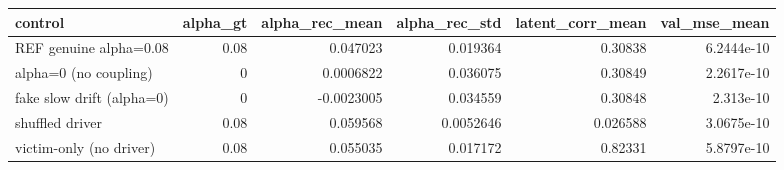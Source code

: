 \begin{tabular}{lrrrrr}
\toprule
control & alpha_gt & alpha_rec_mean & alpha_rec_std & latent_corr_mean & val_mse_mean \\
\midrule
REF genuine alpha=0.08 & 0.08 & 0.047023 & 0.019364 & 0.30838 & 6.2444e-10 \\
alpha=0 (no coupling) & 0 & 0.0006822 & 0.036075 & 0.30849 & 2.2617e-10 \\
fake slow drift (alpha=0) & 0 & -0.0023005 & 0.034559 & 0.30848 & 2.313e-10 \\
shuffled driver & 0.08 & 0.059568 & 0.0052646 & 0.026588 & 3.0675e-10 \\
victim-only (no driver) & 0.08 & 0.055035 & 0.017172 & 0.82331 & 5.8797e-10 \\
\bottomrule
\end{tabular}

